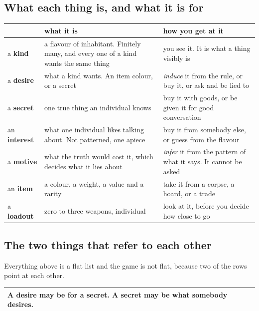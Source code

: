 \documentclass[11pt,a4paper]{article}
\begin{document}
\subsection{What each thing is, and what it is for}

\begin{center}
\begin{tabular}{@{}l@{\hspace{4mm}}>{\raggedright\arraybackslash}p{}@{\hspace{4mm}}>{\raggedright\arraybackslash}p{}@{}}
\toprule
& \textbf{what it is} & \textbf{how you get at it} \\
\midrule
a \textbf{kind}      & a flavour of inhabitant. Finitely many, and every one of a kind wants the
same thing &
you see it. It is what a thing visibly is \\[1mm]
a \textbf{desire}    & what a kind wants. An item colour, or a secret &
\emph{induce} it from the rule, or buy it, or ask and be lied to \\[1mm]
a \textbf{secret}    & one true thing an individual knows &
buy it with goods, or be given it for good conversation \\[1mm]
an \textbf{interest} & what one individual likes talking about. Not patterned, one apiece &
buy it from somebody else, or guess from the flavour \\[1mm]
a \textbf{motive}    & what the truth would cost it, which decides what it lies about &
\emph{infer} it from the pattern of what it says. It cannot be asked \\[1mm]
an \textbf{item}     & a colour, a weight, a value and a rarity &
take it from a corpse, a hoard, or a trade \\[1mm]
a \textbf{loadout}   & zero to three weapons, individual &
look at it, before you decide how close to go \\
\bottomrule
\end{tabular}
\end{center}

\subsection{The two things that refer to each other}

Everything above is a flat list and the game is not flat, because two of the rows point at each
other.

\begin{center}
\begin{tabular}{@{}>{\raggedright\arraybackslash}p{}@{}}
\toprule
\textbf{A desire may be for a secret. A secret may be what somebody desires.} \\
\bottomrule
\end{tabular}
\end{center}
\end{document}
